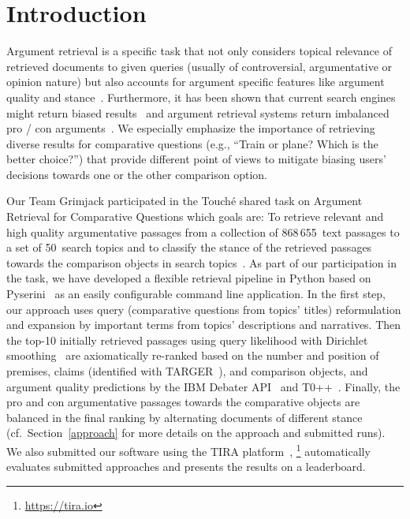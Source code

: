 
\section{Introduction}\label{intro}

Argument retrieval is a specific task that not only considers topical relevance of retrieved documents to given queries (usually of controversial, argumentative or opinion nature) but also accounts for argument specific features like argument quality and stance~\cite{BondarenkoFBGAPBSWPH2020, BondarenkoGFBAPBSWPH2021}.  
Furthermore, it has been shown that current search engines might return biased results~\cite{ShahB2022} and argument retrieval systems return imbalanced pro / con arguments~\cite{CherumanalSSC2021}.
We especially emphasize the importance of retrieving diverse results for comparative questions (e.g., ``Train or plane? Which is the better choice?'') that provide different point of views to mitigate biasing users' decisions towards one or the other comparison option.

Our Team Grimjack participated in the Touch{\'e} shared task on Argument Retrieval for Comparative Questions which goals are: \Ni To retrieve relevant and high quality argumentative passages from a collection of 868\,655~text passages to a set of 50~search topics and \Nii to classify the stance of the retrieved passages towards the comparison objects in search topics~\cite{BondarenkoFKSGBPBSWPH2022}.
As part of our participation in the task, we have developed a flexible retrieval pipeline in Python based on Pyserini~\cite{LinMLYPN2021} as an easily configurable command line application.
In the first step, our approach uses query (comparative questions from topics' titles) reformulation and expansion by important terms from topics' descriptions and narratives. Then the top-10 initially retrieved passages using query likelihood with Dirichlet smoothing~\cite{ZhaiL2001} are axiomatically re-ranked based on the number and position of premises, claims (identified with TARGER~\cite{ChernodubOHBHBP2019}), and comparison objects, and argument quality predictions by the IBM Debater API~\cite{ToledoGCFVLJAS2019} and T0++~\cite{SanhWRBSACSLRDBXTSSKCNDCJWMSYPBWNRSSFFTBGBWR2021}.
Finally, the pro and con argumentative passages towards the comparative objects are balanced in the final ranking by alternating documents of different stance (cf.\ Section~\ref{approach} for more details on the approach and submitted runs). We also submitted our software using the TIRA platform~\cite{PotthastGWS2019},%
\footnote{\url{https://tira.io}} automatically evaluates submitted approaches and presents the results on a leaderboard.%

